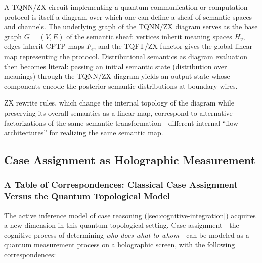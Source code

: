 \documentclass[
]{article}
\begin{document}
A TQNN/ZX circuit implementing a quantum communication or computation
protocol is itself a diagram over which one can define a sheaf of
semantic spaces and channels. The underlying graph of the TQNN/ZX
diagram serves as the base graph \(G=(V,E)\) of the semantic sheaf:
vertices inherit meaning spaces \(H_v\), edges inherit CPTP maps
\(F_e\), and the TQFT/ZX functor gives the global linear map
representing the protocol. Distributional semantics as diagram
evaluation then becomes literal: passing an initial semantic state
(distribution over meanings) through the TQNN/ZX diagram yields an
output state whose components encode the posterior semantic
distributions at boundary wires.

ZX rewrite rules, which change the internal topology of the diagram
while preserving its overall semantics as a linear map, correspond to
alternative factorizations of the same semantic
transformation---different internal ``flow architectures'' for realizing
the same semantic map.

\subsection{Case Assignment as Holographic
Measurement}\label{case-assignment-as-holographic-measurement}

\subsubsection{A Table of Correspondences: Classical Case Assignment
Versus the Quantum Topological
Model}\label{a-table-of-correspondences-classical-case-assignment-versus-the-quantum-topological-model}

The active inference model of case reasoning
(\autoref{sec:cognitive-integration}) acquires a new dimension in this
quantum topological setting. Case assignment---the cognitive process of
determining \emph{who does what to whom}---can be modeled as a quantum
measurement process on a holographic screen, with the following
correspondences:
\end{document}
